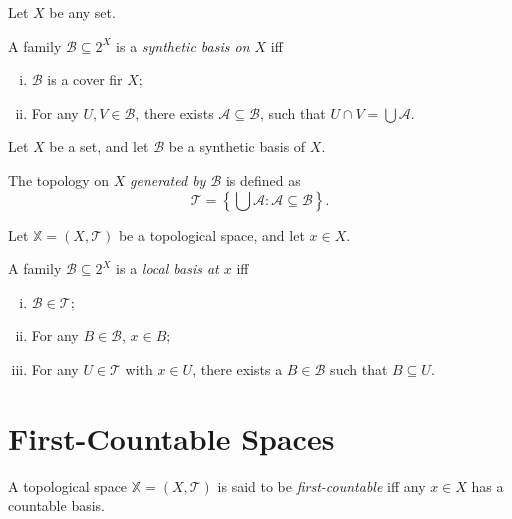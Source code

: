 \begin{definition}
	\label{def: synthetic basis}
	Let $X$ be any set.
	
	A family $\mathcal B \subseteq 2^X$ is a \textit{synthetic basis on $X$} iff
	\begin{enumerate}[(i)]
		\item $\mathcal B$ is a cover fir $X$;
		\item For any $U, V \in \mathcal B$, there exists $\mathcal A \subseteq \mathcal B$, such that $U \cap V = \bigcup \mathcal A$.
	\end{enumerate}
\end{definition}


\begin{definition}
	\label{def: topology generated by basis}
	Let $X$ be a set, and let $\mathcal B$ be a synthetic basis of $X$.
	
	The topology on $X$ \textit{generated by $\mathcal B$} is defined as
	$$
	\mathcal T = \left\{ \bigcup \mathcal A : \mathcal A \subseteq \mathcal B \right\}.
	$$
\end{definition}


\begin{definition}
	\label{def: local basis}
	Let $\mathbb X = (X, \mathcal T)$ be a topological space, and let $x \in X$.
	
	A family $\mathcal B \subseteq 2^X$ is a \textit{local basis at $x$} iff
	\begin{enumerate}[(i)]
		\item $\mathcal B \in \mathcal T$;
		\item For any $B \in \mathcal B$, $x \in B$;
		\item For any $U \in \mathcal T$ with $x \in U$, there exists a $B \in \mathcal B$ such that $B \subseteq U$.
	\end{enumerate}
\end{definition}


\section{First-Countable Spaces}


\begin{definition}
	\label{def: first-countable}
	A topological space $\mathbb X = (X, \mathcal T)$ is said to be \textit{first-countable} iff any $x \in X$ has a countable basis.
\end{definition}


